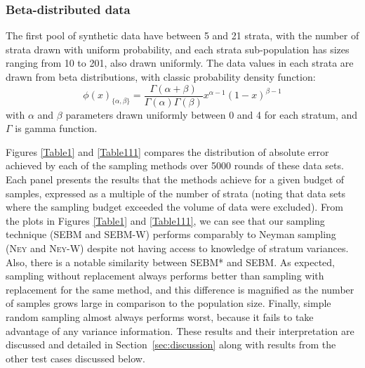 \subsubsection{Beta-distributed data}\label{sec:beta_distributed_data}
The first pool of synthetic data %
have between 5 and 21 strata, with the number of strata drawn with uniform probability, 
and each strata sub-population has sizes ranging from 10 to 201, also drawn uniformly.
The data values in each strata are drawn from beta distributions, with classic probability density function:
$$\phi(x)_{\{\alpha,\beta\}}
=\frac{\Gamma(\alpha+\beta)}{\Gamma(\alpha)\Gamma(\beta)}     
    x^{\alpha-1}(1-x)^{\beta-1} $$
with $\alpha$ and $\beta$ parameters drawn uniformly between 0 and 4 for each stratum, and $\Gamma$ is gamma function.










Figures \ref{Table1} and \ref{Table111} compares the distribution of absolute error achieved by each of the sampling methods over 5000 rounds of these data sets.
Each panel presents the results that the methods achieve for a given budget of samples, 
expressed as a multiple of the number of strata (noting that data sets where the sampling budget exceeded the volume of data were excluded).
From the plots in Figures \ref{Table1} and \ref{Table111}, we can see that our sampling technique (SEBM and SEBM-W) performs comparably to
Neyman sampling (\textsc{Ney} and \textsc{Ney-W}) despite not having access to knowledge of stratum variances.
Also, there is a notable similarity between SEBM* and SEBM.
As expected, sampling without replacement always performs better than sampling with replacement for the same method, and this difference is magnified as the number of samples grows large in comparison to the population size. 
Finally, simple random sampling almost always performs worst, because it fails to take advantage of any variance information.
These results and their interpretation are discussed and detailed in Section~\ref{sec:discussion} along with results from the other test cases discussed below.



